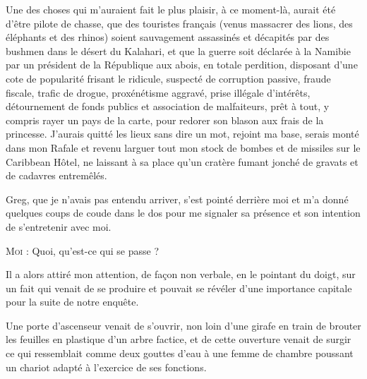 Une des choses qui m’auraient fait le plus plaisir, à ce moment-là, aurait été d’être pilote de chasse, que des touristes français (venus massacrer des lions, des éléphants et des rhinos) soient sauvagement assassinés et décapités par des bushmen dans le désert du Kalahari, et que la guerre soit déclarée à la Namibie par un président de la République aux abois, en totale perdition, disposant d’une cote de popularité frisant le ridicule, suspecté de corruption passive, fraude fiscale, trafic de drogue, proxénétisme aggravé, prise illégale d’intérêts, détournement de fonds publics et association de malfaiteurs, prêt à tout, y compris rayer un pays de la carte, pour redorer son blason aux frais de la princesse. J’aurais quitté les lieux sans dire un mot, rejoint ma base, serais monté dans mon Rafale et revenu larguer tout mon stock de bombes et de missiles sur le Caribbean Hôtel, ne laissant à sa place qu’un cratère fumant jonché de gravats et de cadavres entremêlés.

Greg, que je n’avais pas entendu arriver, s’est pointé derrière moi et m’a donné quelques coups de coude dans le dos pour me signaler sa présence et son intention de s’entretenir avec moi.

\begin{dialogue}

\textsc{Moi} : Quoi, qu’est-ce qui se passe ?

\end{dialogue}

Il a alors attiré mon attention, de façon non verbale, en le pointant du doigt, sur un fait qui venait de se produire et pouvait se révéler d’une importance capitale pour la suite de notre enquête.

%

\scene

Une porte d’ascenseur venait de s’ouvrir, non loin d’une girafe en train de brouter les feuilles en plastique d’un arbre factice, et de cette ouverture venait de surgir ce qui ressemblait comme deux gouttes d’eau à une femme de chambre poussant un chariot adapté à l’exercice de ses fonctions.

